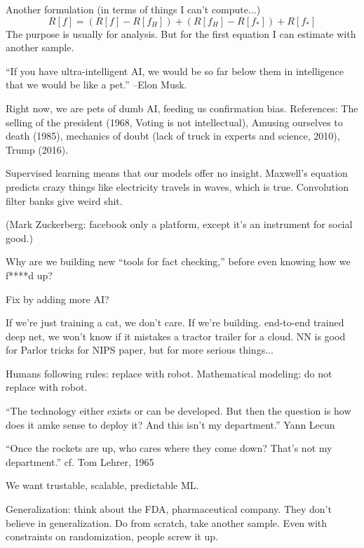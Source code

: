 Another formulation (in terms of things I can't compute...)
$$
R[f] = (R[f]-R[f_H]) + (R[f_H] - R[f_*]) + R[f_*]
$$
The purpose is usually for analysis. But for the first equation I can estimate with another sample.

``If you have ultra-intelligent AI, we would be so far below them in intelligence that we would be like a pet.'' --Elon Musk.

Right now, we are pets of dumb AI, feeding us confirmation bias.
References: The selling of the president (1968, Voting is not intellectual), Amusing ourselves to death (1985), mechanics of doubt (lack of truck in experts and science, 2010), Trump (2016).

Supervised learning means that our models offer no insight. Maxwell's equation predicts crazy things like electricity travels in waves, which is true. Convolution filter banks give weird shit.

(Mark Zuckerberg: facebook only a platform, except it's an  instrument for social good.)

Why are we building new ``tools for fact checking,'' before even knowing how we f****d up? 

Fix by adding more AI?

If we're just training a cat, we don't care. If we're building.
end-to-end trained deep net, we won't know if it mistakes a tractor trailer for a cloud.
NN is good for Parlor tricks for NIPS paper, but for more serious things...

Humans following rules: replace with robot. Mathematical modeling: do not replace with robot.

``The technology either exists or can be developed. But then the question is how does it amke sense to deploy it? And this isn't my department.''
Yann Lecun 

``Once the rockets are up, who cares where they come down? That's not my department.'' cf. Tom Lehrer, 1965

We want trustable, scalable, predictable ML.

Generalization: think about the FDA, pharmaceutical company. They don't believe in generalization. Do from scratch, take another sample. Even with constraints on randomization, people screw it up.

